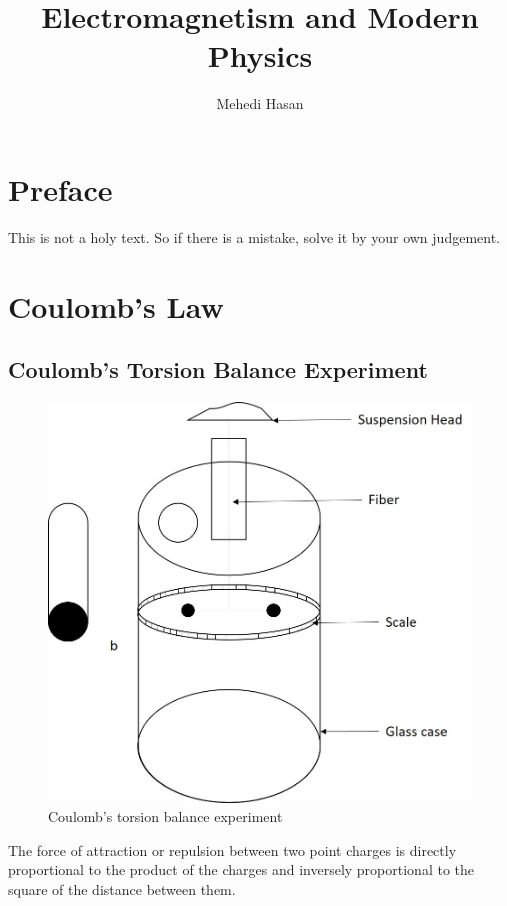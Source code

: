 \documentclass[12pt]{article}
\theoremstyle{definition}
\begin{document}
\title{Electromagnetism and Modern Physics}
\author{Mehedi Hasan}
\maketitle
\newpage
\section*{Preface}
This is not a holy text. So if there is a mistake, solve it by your own judgement.
\newpage
\tableofcontents
\newpage
{}
\section{Coulomb's Law}
\subsection{Coulomb's Torsion Balance Experiment}
\begin{figure}[h]
    \centering
    \includegraphics[scale=.5]{Picture1}
    \caption{Coulomb's torsion balance experiment}
    \label{fig:couTorsion}
\end{figure}
The force of attraction or repulsion between two point charges is directly proportional to the product of the charges and inversely proportional to the square of the distance between them. 
\end{document}
